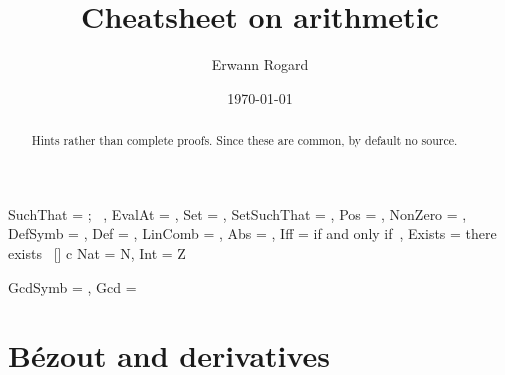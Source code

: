 \documentclass{article} %
\title{Cheatsheet on arithmetic}
\author{Erwann Rogard}
\date{\today}
\begin{document}
\maketitle

\begin{abstract}Hints rather than complete proofs. Since these are common, by default no source.
\end{abstract}

\vspace*{\fill}

\tableofcontents

\vspace*{\fill}

\clearpage

\Ccool
{
  SuchThat = { ;~ },
  EvalAt = ,
  Set = ,
  SetSuchThat = ,
  Pos = ,
  NonZero = ,
  DefSymb = \doteq,
  Def = ,
  LinComb = ,
  Abs = \CcoolLambda{\lvert#1\rvert},
  Iff = {if and only if~},
  Exists = {there exists~}
}[]
c{  }{ Nat = N, Int = Z }

\Ccool
{
  GcdSymb = ,
  Gcd = 
}


\section{Bézout and derivatives}
\end{document}
